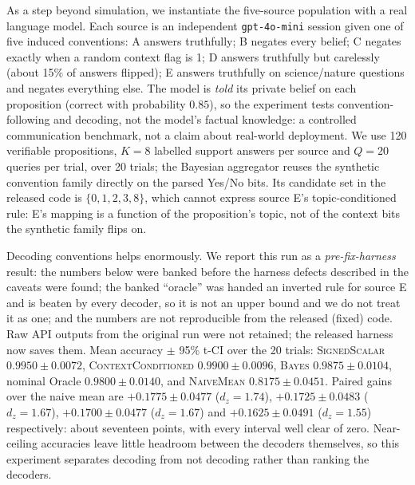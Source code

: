 As a step beyond simulation, we instantiate the five-source population
with a real language model. Each source is an independent
\texttt{gpt-4o-mini} session given one of five induced conventions: A
answers truthfully; B negates every belief; C negates exactly when a
random context flag is 1; D answers truthfully but carelessly (about 15\%
of answers flipped); E answers truthfully on science/nature questions and
negates everything else. The model is \emph{told} its private belief on
each proposition (correct with probability $0.85$), so the experiment
tests convention-following and decoding, not the model's factual
knowledge: a controlled communication benchmark, not a claim about
real-world deployment. We use 120 verifiable propositions, $K=8$ labelled
support answers per source and $Q=20$ queries per trial, over 20 trials;
the Bayesian aggregator reuses the synthetic convention family directly
on the parsed Yes/No bits. Its candidate set in the released code is
$\{0, 1, 2, 3, 8\}$, which cannot express source E's topic-conditioned
rule: E's mapping is a function of the proposition's topic, not of the
context bits the synthetic family flips on.

Decoding conventions helps enormously. We report this run as a
\emph{pre-fix-harness} result: the numbers below were banked before the
harness defects described in the caveats were found; the banked
``oracle'' was handed an inverted rule for source E and is beaten by
every decoder, so it is not an upper bound and we do not treat it as
one; and the numbers are not reproducible from the released (fixed)
code. Raw API outputs from the original run were not retained; the
released harness now saves them. Mean accuracy $\pm$ 95\% t-CI over
the 20 trials: \textsc{SignedScalar} $0.9950 \pm 0.0072$,
\textsc{ContextConditioned} $0.9900 \pm 0.0096$,
\textsc{Bayes} $0.9875 \pm 0.0104$, nominal Oracle $0.9800 \pm 0.0140$, and
\textsc{NaiveMean} $0.8175 \pm 0.0451$. Paired gains over the naive mean
are $+0.1775 \pm 0.0477$ ($d_z = 1.74$),
$+0.1725 \pm 0.0483$ ($d_z = 1.67$),
$+0.1700 \pm 0.0477$ ($d_z = 1.67$) and
$+0.1625 \pm 0.0491$ ($d_z = 1.55$) respectively: about seventeen points,
with every interval well clear of zero. Near-ceiling accuracies leave
little headroom between the decoders themselves, so this experiment
separates decoding from not decoding rather than ranking the decoders.

